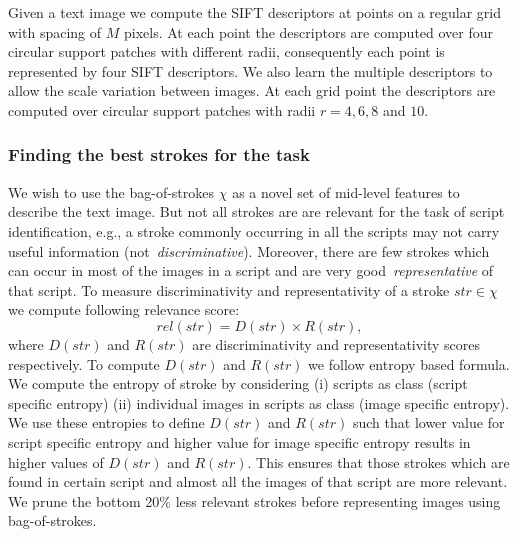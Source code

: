 
Given a text image we compute the SIFT descriptors at points on a regular grid with spacing of $M$ pixels. At each point the descriptors are computed over four circular support patches with different radii, consequently each point is represented by four SIFT descriptors. We also learn the multiple descriptors to allow the scale variation between images. At each grid point the descriptors are computed over circular support patches with radii $r = 4,6,8$ and $10$.

\subsubsection{Finding the best strokes for the task}
\label{sec:best}
We wish to use the bag-of-strokes $\chi$ as a novel set of mid-level
features to describe the text image. But not all strokes are
are relevant for the task of script identification, e.g., 
a stroke commonly occurring in all the scripts may not carry
useful information (not~\emph{discriminative}). Moreover, there 
are few strokes which can occur in most of the images in a script 
and are very good~\emph{representative} of that script. To measure
discriminativity and representativity of a stroke $str \in \chi$  we compute following relevance score:
\begin{equation}
rel(str) = D(str) \times R(str),
\end{equation}
where $D(str)$ and $R(str)$ are discriminativity and representativity scores respectively. To compute $D(str)$ and $R(str)$ we follow entropy based formula.
We compute the entropy of stroke by considering (i) scripts as class (script specific entropy) (ii) individual images in scripts as class (image specific entropy). We use these entropies to define $D(str)$ and $R(str)$ such that lower value for script specific entropy and higher value for image specific entropy results in higher values of $D(str)$ and $R(str)$. This ensures that those strokes which are found in certain script and almost all the images of that script are more relevant. We prune the bottom 20\% less relevant strokes before representing images using bag-of-strokes. 

